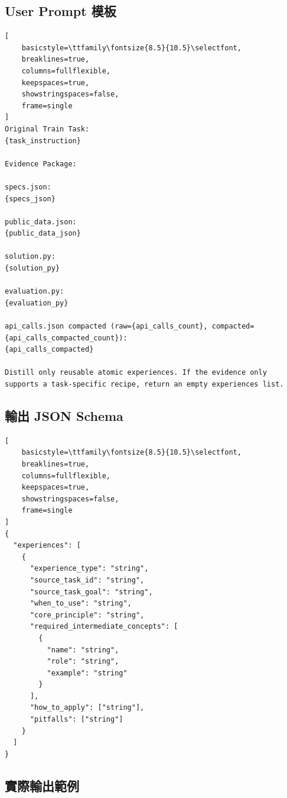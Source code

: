 \subsection*{User Prompt 模板}

\begin{lstlisting}[
    basicstyle=\ttfamily\fontsize{8.5}{10.5}\selectfont,
    breaklines=true,
    columns=fullflexible,
    keepspaces=true,
    showstringspaces=false,
    frame=single
]
Original Train Task:
{task_instruction}

Evidence Package:

specs.json:
{specs_json}

public_data.json:
{public_data_json}

solution.py:
{solution_py}

evaluation.py:
{evaluation_py}

api_calls.json compacted (raw={api_calls_count}, compacted={api_calls_compacted_count}):
{api_calls_compacted}

Distill only reusable atomic experiences. If the evidence only supports a task-specific recipe, return an empty experiences list.
\end{lstlisting}

\subsection*{輸出 JSON Schema}

\begin{lstlisting}[
    basicstyle=\ttfamily\fontsize{8.5}{10.5}\selectfont,
    breaklines=true,
    columns=fullflexible,
    keepspaces=true,
    showstringspaces=false,
    frame=single
]
{
  "experiences": [
    {
      "experience_type": "string",
      "source_task_id": "string",
      "source_task_goal": "string",
      "when_to_use": "string",
      "core_principle": "string",
      "required_intermediate_concepts": [
        {
          "name": "string",
          "role": "string",
          "example": "string"
        }
      ],
      "how_to_apply": ["string"],
      "pitfalls": ["string"]
    }
  ]
}
\end{lstlisting}

\subsection*{實際輸出範例}

